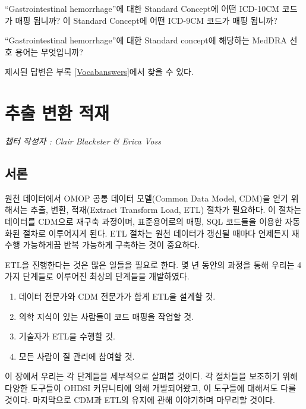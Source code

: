 \documentclass[11pt]{book}
\providecommand{\tightlist}{%
  \setlength{\itemsep}{0pt}\setlength{\parskip}{0pt}}
\theoremstyle{definition}
\theoremstyle{definition}
\theoremstyle{definition}
\theoremstyle{remark}
\let\BeginKnitrBlock\begin \let\EndKnitrBlock\end
\begin{document}
\BeginKnitrBlock{exercise}
\protect\hypertarget{exr:exerciseVocab2}{}{\label{exr:exerciseVocab2}
}``Gastrointestinal hemorrhage''에 대한 Standard Concept에 어떤 ICD-10CM
코드가 매핑 됩니까? 이 Standard Concept에 어떤 ICD-9CM 코드가 매핑
됩니까?
\EndKnitrBlock{exercise}

\BeginKnitrBlock{exercise}
\protect\hypertarget{exr:exerciseVocab3}{}{\label{exr:exerciseVocab3}
}``Gastrointestinal hemorrhage''에 대한 Standard concept에 해당하는
MedDRA 선호 용어는 무엇입니까?
\EndKnitrBlock{exercise}

제시된 답변은 부록 \ref{Vocabanswers}에서 찾을 수 있다.

\chapter{추출 변환 적재}\label{ExtractTransformLoad}

\emph{챕터 작성자 : Clair Blacketer \& Erica Voss}

\section{서론}

원천 데이터에서 OMOP 공통 데이터 모델(Common Data Model, CDM)을 얻기
위해서는 추출, 변환, 적재(Extract Transform Load, ETL) 절차가 필요하다.
이 절차는 데이터를 CDM으로 재구축 과정이며, 표준용어로의 매핑, SQL
코드들을 이용한 자동화된 절차로 이루어지게 된다. ETL 절차는 원천
데이터가 갱신될 때마다 언제든지 재수행 가능하게끔 반복 가능하게 구축하는
것이 중요하다. 
 

ETL을 진행한다는 것은 많은 일들을 필요로 한다. 몇 년 동안의 과정을 통해
우리는 4가지 단계들로 이루어진 최상의 단계들을 개발하였다.

\begin{enumerate}
\def\labelenumi{\arabic{enumi}.}
\tightlist
\item
  데이터 전문가와 CDM 전문가가 함게 ETL을 설계할 것.
\item
  의학 지식이 있는 사람들이 코드 매핑을 작업할 것.
\item
  기술자가 ETL을 수행할 것.
\item
  모든 사람이 질 관리에 참여할 것.
\end{enumerate}

이 장에서 우리는 각 단계들을 세부적으로 살펴볼 것이다. 각 절차들을
보조하기 위해 다양한 도구들이 OHDSI 커뮤니티에 의해 개발되어왔고, 이
도구들에 대해서도 다룰 것이다. 마지막으로 CDM과 ETL의 유지에 관해
이야기하며 마무리할 것이다.
\end{document}
